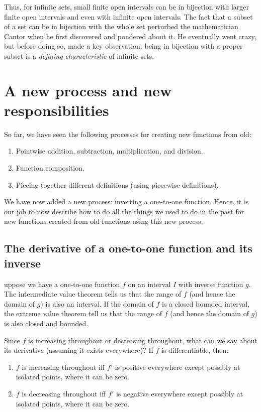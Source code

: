 \documentclass[10pt]{amsart}
\begin{document}
Thus, for infinite sets, small finite open intervals can be in
bijection with larger finite open intervals and even with infinite
open intervals. The fact that a subset of a set can be in bijection
with the whole set perturbed the mathematician Cantor when he first
discovered and pondered about it. He eventually went crazy, but before
doing so, made a key observation: being in bijection with a proper
subset is a {\em defining characteristic} of infinite sets.

\section{A new process and new responsibilities}

So far, we have seen the following processes for creating new
functions from old:

\begin{enumerate}
\item Pointwise addition, subtraction, multiplication, and division.
\item Function composition.
\item Piecing together different definitions (using piecewise
  definitions).
\end{enumerate}

We have now added a new process: inverting a one-to-one
function. Hence, it is our job to now describe how to do all the
things we used to do in the past for new functions created from old
functions using this new process.

\subsection{The derivative of a one-to-one function and its inverse}

uppose we have a one-to-one function $f$ on an interval $I$ with
inverse function $g$. The intermediate value theorem tells us that the
range of $f$ (and hence the domain of $g$) is also an interval. If the
domain of $f$ is a closed bounded interval, the extreme value theorem
tell us that the range of $f$ (and hence the domain of $g$) is also
closed and bounded.

Since $f$ is increasing throughout or decreasing throughout, what can
we say about its derivative (assuming it exists everywhere)? If $f$ is
differentiable, then:

\begin{enumerate}
\item $f$ is increasing throughout iff $f'$ is positive everywhere
  except possibly at isolated points, where it can be zero.
\item $f$ is decreasing throughout iff $f'$ is negative everywhere
  except possibly at isolated points, where it can be zero.
\end{enumerate}
\end{document}
